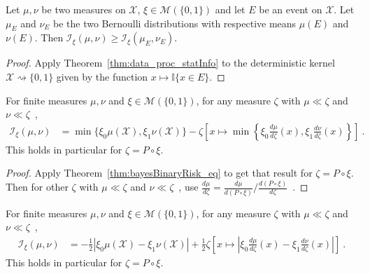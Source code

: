 \begin{corollary}
  \label{cor:statInfo_data_proc_event}
  \leanok
  Let $\mu, \nu$ be two measures on $\mathcal X$, $\xi \in \mathcal M(\{0,1\})$ and let $E$ be an event on $\mathcal X$. Let $\mu_E$ and $\nu_E$ be the two Bernoulli distributions with respective means $\mu(E)$ and $\nu(E)$.
  Then $\mathcal I_\xi(\mu, \nu) \ge \mathcal I_\xi(\mu_E, \nu_E)$.
\end{corollary}

\begin{proof}\leanok
{}
Apply Theorem~\ref{thm:data_proc_statInfo} to the deterministic kernel $\mathcal X \rightsquigarrow \{0,1\}$ given by the function $x \mapsto \mathbb{I}\{x \in E\}$.
\end{proof}


\begin{lemma}
  \label{lem:statInfo_eq_sub_min}
  \leanok
  For finite measures $\mu, \nu$ and $\xi \in \mathcal M(\{0,1\})$, for any measure $\zeta$ with $\mu \ll \zeta$ and $\nu \ll \zeta$~,
  \begin{align*}
  \mathcal I_\xi(\mu, \nu)
  &= \min\{\xi_0\mu(\mathcal X), \xi_1\nu(\mathcal X)\} - \zeta\left[x \mapsto \min \left\{\xi_0\frac{d \mu}{d\zeta}(x), \xi_1\frac{d \nu}{d\zeta}(x)\right\}\right]
  \: .
  \end{align*}
  This holds in particular for $\zeta = P \circ \xi$.
\end{lemma}

\begin{proof}\leanok
{}
Apply Theorem~\ref{thm:bayesBinaryRisk_eq} to get that result for $\zeta = P \circ \xi$. Then for other $\zeta$ with $\mu \ll \zeta$ and $\nu \ll \zeta$~, use $\frac{d \mu}{d\zeta} = \frac{d \mu}{d(P \circ \xi)} / \frac{d (P \circ \xi)}{d\zeta}$~.
\end{proof}


\begin{lemma}
  \label{lem:statInfo_eq_integral_abs_sub}
  \leanok
  For finite measures $\mu, \nu$ and $\xi \in \mathcal M(\{0,1\})$, for any measure $\zeta$ with $\mu \ll \zeta$ and $\nu \ll \zeta$~,
  \begin{align*}
  \mathcal I_\xi(\mu, \nu)
  &= - \frac{1}{2} \left\vert \xi_0\mu(\mathcal X) - \xi_1\nu(\mathcal X) \right\vert + 
  \frac{1}{2} \zeta\left[x \mapsto \left\vert \xi_0\frac{d \mu}{d\zeta}(x) - \xi_1\frac{d \nu}{d\zeta}(x)\right\vert\right] 
  \: .
  \end{align*}
  This holds in particular for $\zeta = P \circ \xi$.
\end{lemma}

